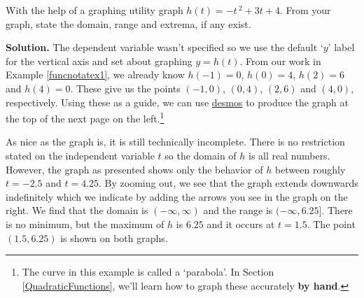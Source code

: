 \documentclass{ximera}
\begin{document}
\begin{example} \label{graphalgebraicex}  With the help of a graphing utility graph $h(t) = -t\,^{2} + 3t + 4$.  From your graph, state the domain, range and extrema, if any exist.

{\bf Solution.} The dependent variable wasn't specified so we use the default `$y$' label for the vertical axis and set about graphing $y = h(t)$.   From our work in Example \ref{funcnotatex1},  we already know  $h(-1) = 0$, $h(0) = 4$, $h(2) = 6$ and $h(4) = 0$.  These give us the points $(-1,0)$, $(0,4)$, $(2,6)$ and $(4,0)$, respectively.  Using these as a guide, we can use  \href{https://www.desmos.com/}{{desmos}} to produce the graph at the top of the next page on the left.\footnote{The curve in this example is called a 	`parabola'.  In Section \ref{QuadraticFunctions}, we'll learn how to graph these accurately \textbf{by hand}.} 

 

As nice as the graph is, it is still technically incomplete.  There is no restriction stated on the independent variable $t$ so the domain of $h$ is all real numbers. However, the graph as presented shows only the behavior of $h$ between roughly $t = -2.5$ and $t = 4.25$.  By zooming out, we see that the graph extends downwards indefinitely which we indicate by adding the arrows you see in the graph on the right.  We find that the domain is $(-\infty, \infty)$ and the range is $(-\infty, 6.25]$.  There is no minimum, but the  maximum of $h$ is $6.25$ and it occurs at $t = 1.5$.  The point $(1.5, 6.25)$ is shown on both graphs.









\end{example}
\end{document}
